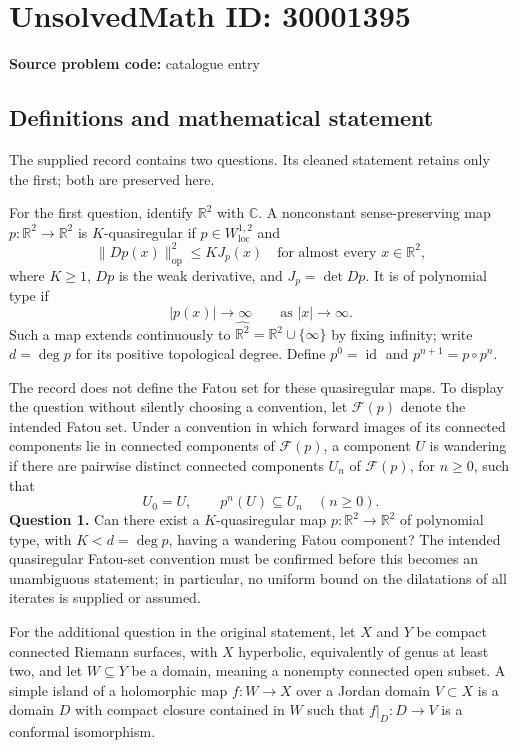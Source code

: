 \documentclass[11pt]{article}
\newcommand{\R}{\mathbb{R}}
\newcommand{\C}{\mathbb{C}}
\begin{document}
\section*{UnsolvedMath ID: 30001395}
\textbf{Source problem code:} catalogue entry
\subsection{Definitions and mathematical statement}
The supplied record contains two questions. Its cleaned statement retains only the first; both are preserved here.

For the first question, identify \(\R^2\) with \(\C\). A nonconstant sense-preserving map \(p\colon\R^2\to\R^2\) is \(K\)-quasiregular if \(p\in W^{1,2}_{\mathrm{loc}}\) and
\[
\|Dp(x)\|_{\mathrm{op}}^2\leq K J_p(x)
\quad\text{for almost every }x\in\R^2,
\]
where \(K\geq1\), \(Dp\) is the weak derivative, and \(J_p=\det Dp\). It is of polynomial type if
\[
|p(x)|\longrightarrow\infty\qquad\text{as }|x|\longrightarrow\infty.
\]
Such a map extends continuously to \(\widehat{\R^2}=\R^2\cup\{\infty\}\) by fixing infinity; write \(d=\deg p\) for its positive topological degree. Define \(p^0=\operatorname{id}\) and \(p^{n+1}=p\circ p^n\).

The record does not define the Fatou set for these quasiregular maps. To display the question without silently choosing a convention, let \(\mathcal F(p)\) denote the intended Fatou set. Under a convention in which forward images of its connected components lie in connected components of \(\mathcal F(p)\), a component \(U\) is wandering if there are pairwise distinct connected components \(U_n\) of \(\mathcal F(p)\), for \(n\geq0\), such that
\[
U_0=U,\qquad p^n(U)\subseteq U_n\quad(n\geq0).
\]
\textbf{Question 1.} Can there exist a \(K\)-quasiregular map \(p\colon\R^2\to\R^2\) of polynomial type, with \(K<d=\deg p\), having a wandering Fatou component? The intended quasiregular Fatou-set convention must be confirmed before this becomes an unambiguous statement; in particular, no uniform bound on the dilatations of all iterates is supplied or assumed.

For the additional question in the original statement, let \(X\) and \(Y\) be compact connected Riemann surfaces, with \(X\) hyperbolic, equivalently of genus at least two, and let \(W\subseteq Y\) be a domain, meaning a nonempty connected open subset. A simple island of a holomorphic map \(f\colon W\to X\) over a Jordan domain \(V\subset X\) is a domain \(D\) with compact closure contained in \(W\) such that \(f|_D\colon D\to V\) is a conformal isomorphism.
\end{document}
